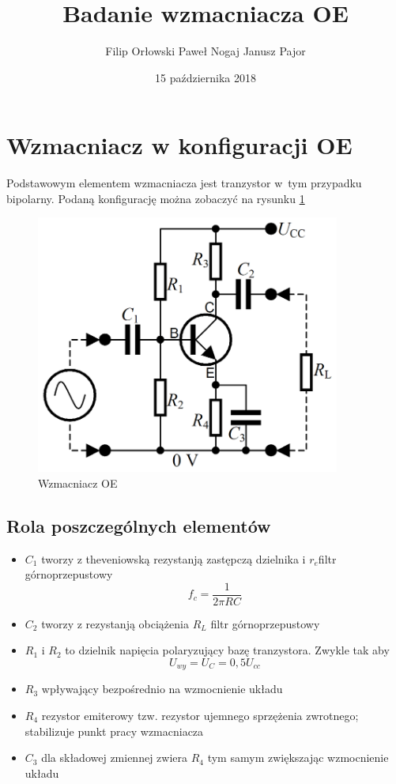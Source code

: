 \documentclass[a4paper,12pt]{article}
\title{Badanie wzmacniacza OE}
\date{15 października 2018}
\author{Filip Orłowski Paweł Nogaj Janusz Pajor}
\begin{document}
\maketitle
\newpage
\section{Wzmacniacz w konfiguracji OE}
Podstawowym elementem wzmacniacza jest tranzystor w~tym przypadku
bipolarny. Podaną konfigurację można zobaczyć na rysunku \ref{fig:oe}

\begin{figure}[H]
    \centering
    \includegraphics[width=10cm]{OE.png}
    \caption{Wzmacniacz OE}
    \label{fig:oe}
\end{figure}

\subsection{Rola poszczególnych elementów}
\begin{itemize}
    \item $C_1$ tworzy z theveniowską rezystanją zastępczą 
    dzielnika i $r_e $filtr górnoprzepustowy 
        \begin{equation*}
            f_c = \frac{1}{2\pi RC}
        \end{equation*}
    \item $C_2$ tworzy z rezystanją obciążenia $R_L$ filtr górnoprzepustowy
    \item $R_1$ i $R_2$ to dzielnik napięcia polaryzujący bazę tranzystora. Zwykle tak aby 
        \begin{equation*}
            U_{wy} = U_C = 0,5U_{cc}
        \end{equation*}
    \item $R_3$ wpływający bezpośrednio na wzmocnienie układu 
    \item $R_4$ rezystor emiterowy tzw. rezystor ujemnego sprzężenia zwrotnego;
        stabilizuje punkt pracy wzmacniacza

    \item $C_3$ dla składowej zmiennej zwiera $R_4$ tym samym zwiększając wzmocnienie układu
\end{itemize}
\end{document}
